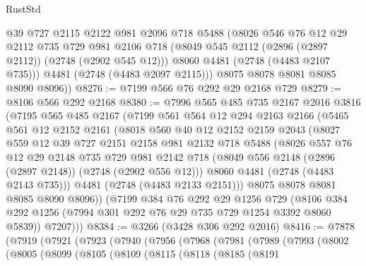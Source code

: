 \begin{lexlean}{RustStd}
\begin{coremodule}
          @39
          @727
          @2115
          @2122
          @981
          @2096
          @718
          @5488
          (@8026
            @546
            @76
            @12
            @29
            @2112
            @735
            @729
            @981
            @2106
            @718
            (@8049 @545 @2112 (@2896 (@2897 @2112)) (@2748 (@2902 @545 @12)))
            @8060
            @4481
            (@2748 (@4483 @2107 @735)))
          @4481
          (@2748 (@4483 @2097 @2115)))
        @8075
        @8078
        @8081
        @8085
        @8090
        @8096))
@8276 := @7199 @566 @76 @292 @29 @2168 @729
@8279 := @8106 @566 @292 @2168
@8380 := @7996
    @565
    @485
    @735
    @2167
    @2016
    @3816
    (@7195
      @565
      @485
      @2167
      (@7199
        @561
        @564
        @12
        @294
        @2163
        @2166
        (@5465
          @561
          @12
          @2152
          @2161
          (@8018
            @560
            @40
            @12
            @2152
            @2159
            @2043
            (@8027
              @559
              @12
              @39
              @727
              @2151
              @2158
              @981
              @2132
              @718
              @5488
              (@8026
                @557
                @76
                @12
                @29
                @2148
                @735
                @729
                @981
                @2142
                @718
                (@8049 @556 @2148 (@2896 (@2897 @2148)) (@2748 (@2902 @556 @12)))
                @8060
                @4481
                (@2748 (@4483 @2143 @735)))
              @4481
              (@2748 (@4483 @2133 @2151)))
            @8075
            @8078
            @8081
            @8085
            @8090
            @8096))
        (@7199
          @384
          @76
          @292
          @29
          @1256
          @729
          (@8106 @384 @292 @1256 (@7994 @301 @292 @76 @29 @735 @729 @1254 @3392 @8060 @5839))
          @7207)))
@8384 := @3266 (@3428 @306 @292 @2016)
@8416 := @7878
    (@7919
      (@7921
        (@7923
          (@7940
            (@7956
              (@7968
                (@7981
                  (@7989
                    (@7993
                      (@8002
                        (@8005
                          (@8099
                            (@8105
                              (@8109
                                (@8115
                                  (@8118
                                    (@8185
                                      (@8191

\end{coremodule}
\end{lexlean}
